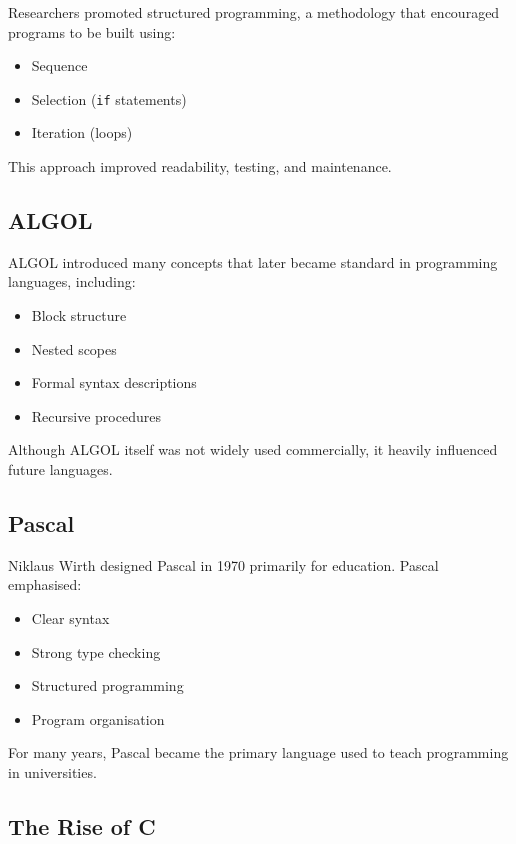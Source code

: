 Researchers promoted structured programming, a methodology that encouraged programs to be built using:

\begin{itemize}
    \item Sequence
    \item Selection (\texttt{if} statements)
    \item Iteration (loops)
\end{itemize}

This approach improved readability, testing, and maintenance.

\subsection{ALGOL}

ALGOL introduced many concepts that later became standard in programming languages, including:

\begin{itemize}
    \item Block structure
    \item Nested scopes
    \item Formal syntax descriptions
    \item Recursive procedures
\end{itemize}

Although ALGOL itself was not widely used commercially, it heavily influenced future languages.

\subsection{Pascal}

Niklaus Wirth designed Pascal in 1970 primarily for education. Pascal emphasised:

\begin{itemize}
    \item Clear syntax
    \item Strong type checking
    \item Structured programming
    \item Program organisation
\end{itemize}

For many years, Pascal became the primary language used to teach programming in universities.

\subsection{The Rise of C}

